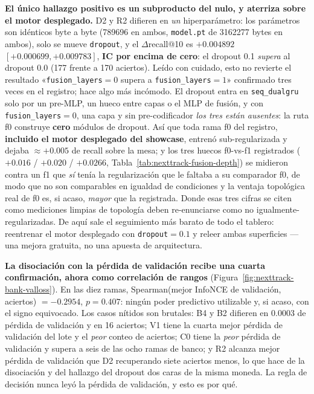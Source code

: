 \documentclass[11pt]{article}
\begin{document}
\textbf{El único hallazgo positivo es un subproducto del nulo, y aterriza sobre el
motor desplegado.} D2 y R2 difieren en \emph{un} hiperparámetro: los parámetros
son idénticos byte a byte (\num{789696} en ambos, \texttt{model.pt} de
\num{3162277} bytes en ambos), solo se mueve \texttt{dropout}, y el
$\Delta$recall@10 es $+\num{0.004892}$
$[+\num{0.000699},+\num{0.009783}]$, \textbf{IC por encima de cero}: el dropout
\num{0.1} \emph{supera} al dropout \num{0.0} (\num{177} frente a \num{170}
aciertos). Leído con cuidado, esto no revierte el resultado
«\texttt{fusion\_layers}${}=0$ supera a \texttt{fusion\_layers}${}=1$»
confirmado tres veces en el
registro; hace algo más incómodo. El dropout entra en
\texttt{seq\_dualgru} solo por un pre-MLP, un hueco entre capas o el MLP de
fusión, y con \texttt{fusion\_layers}${}=0$, una capa y sin pre-codificador
\emph{los tres están ausentes}: la ruta f0 construye \textbf{cero} módulos de
dropout. Así que toda rama f0 del registro, \textbf{incluido el motor desplegado
del showcase}, entrenó sub-regularizada y dejaba
${\approx}+\num{0.005}$ de recall sobre la mesa; y los tres huecos f0-vs-f1
registrados ($+\num{0.016}$ / $+\num{0.020}$ / $+\num{0.0266}$,
Tabla~\ref{tab:nexttrack-fusion-depth}) se midieron contra
un f1 que \emph{sí} tenía la regularización que le faltaba a su comparador f0, de
modo que no son comparables en igualdad de condiciones y la ventaja topológica
real de f0 es, si acaso, \emph{mayor} que la registrada. Donde esas tres cifras se
citen como mediciones limpias de topología deben re-enunciarse como no
igualmente-regularizadas. De aquí sale el seguimiento más barato de todo el
tablero: reentrenar el motor desplegado con \texttt{dropout}${}=\num{0.1}$ y
releer ambas superficies --- una mejora gratuita, no una apuesta de arquitectura.

\textbf{La disociación con la pérdida de validación recibe una cuarta
confirmación, ahora como correlación de rangos}
(Figura~\ref{fig:nexttrack-bank-valloss}). En las diez ramas,
Spearman(mejor InfoNCE de validación, aciertos) $=-\num{0.2954}$,
$p=\num{0.407}$: ningún poder predictivo utilizable y, si acaso, con el signo
equivocado. Los casos nítidos son brutales: B4 y B2 difieren en \num{0.0003} de
pérdida de validación y en \num{16} aciertos; V1 tiene la cuarta mejor pérdida de
validación del lote y el \emph{peor} conteo de aciertos; C0 tiene la \emph{peor}
pérdida de validación y supera a seis de las ocho ramas de banco; y R2 alcanza
mejor pérdida de validación que D2 recuperando siete aciertos menos, lo que hace
de la disociación y del hallazgo del dropout dos caras de la misma moneda. La
regla de decisión nunca leyó la pérdida de validación, y esto es por qué.
\end{document}
